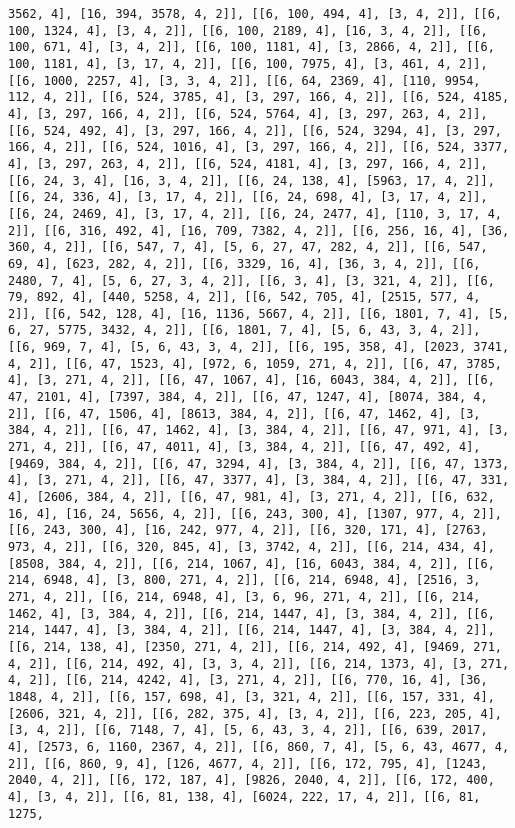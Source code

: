 \documentclass[12pt,fleqn]{article}\usepackage{../../common}
\begin{document}
\begin{verbatim}
3562, 4], [16, 394, 3578, 4, 2]], [[6, 100, 494, 4], [3, 4, 2]], [[6, 100, 1324, 4], [3, 4, 2]], [[6, 100, 2189, 4], [16, 3, 4, 2]], [[6, 100, 671, 4], [3, 4, 2]], [[6, 100, 1181, 4], [3, 2866, 4, 2]], [[6, 100, 1181, 4], [3, 17, 4, 2]], [[6, 100, 7975, 4], [3, 461, 4, 2]], [[6, 1000, 2257, 4], [3, 3, 4, 2]], [[6, 64, 2369, 4], [110, 9954, 112, 4, 2]], [[6, 524, 3785, 4], [3, 297, 166, 4, 2]], [[6, 524, 4185, 4], [3, 297, 166, 4, 2]], [[6, 524, 5764, 4], [3, 297, 263, 4, 2]], [[6, 524, 492, 4], [3, 297, 166, 4, 2]], [[6, 524, 3294, 4], [3, 297, 166, 4, 2]], [[6, 524, 1016, 4], [3, 297, 166, 4, 2]], [[6, 524, 3377, 4], [3, 297, 263, 4, 2]], [[6, 524, 4181, 4], [3, 297, 166, 4, 2]], [[6, 24, 3, 4], [16, 3, 4, 2]], [[6, 24, 138, 4], [5963, 17, 4, 2]], [[6, 24, 336, 4], [3, 17, 4, 2]], [[6, 24, 698, 4], [3, 17, 4, 2]], [[6, 24, 2469, 4], [3, 17, 4, 2]], [[6, 24, 2477, 4], [110, 3, 17, 4, 2]], [[6, 316, 492, 4], [16, 709, 7382, 4, 2]], [[6, 256, 16, 4], [36, 360, 4, 2]], [[6, 547, 7, 4], [5, 6, 27, 47, 282, 4, 2]], [[6, 547, 69, 4], [623, 282, 4, 2]], [[6, 3329, 16, 4], [36, 3, 4, 2]], [[6, 2480, 7, 4], [5, 6, 27, 3, 4, 2]], [[6, 3, 4], [3, 321, 4, 2]], [[6, 79, 892, 4], [440, 5258, 4, 2]], [[6, 542, 705, 4], [2515, 577, 4, 2]], [[6, 542, 128, 4], [16, 1136, 5667, 4, 2]], [[6, 1801, 7, 4], [5, 6, 27, 5775, 3432, 4, 2]], [[6, 1801, 7, 4], [5, 6, 43, 3, 4, 2]], [[6, 969, 7, 4], [5, 6, 43, 3, 4, 2]], [[6, 195, 358, 4], [2023, 3741, 4, 2]], [[6, 47, 1523, 4], [972, 6, 1059, 271, 4, 2]], [[6, 47, 3785, 4], [3, 271, 4, 2]], [[6, 47, 1067, 4], [16, 6043, 384, 4, 2]], [[6, 47, 2101, 4], [7397, 384, 4, 2]], [[6, 47, 1247, 4], [8074, 384, 4, 2]], [[6, 47, 1506, 4], [8613, 384, 4, 2]], [[6, 47, 1462, 4], [3, 384, 4, 2]], [[6, 47, 1462, 4], [3, 384, 4, 2]], [[6, 47, 971, 4], [3, 271, 4, 2]], [[6, 47, 4011, 4], [3, 384, 4, 2]], [[6, 47, 492, 4], [9469, 384, 4, 2]], [[6, 47, 3294, 4], [3, 384, 4, 2]], [[6, 47, 1373, 4], [3, 271, 4, 2]], [[6, 47, 3377, 4], [3, 384, 4, 2]], [[6, 47, 331, 4], [2606, 384, 4, 2]], [[6, 47, 981, 4], [3, 271, 4, 2]], [[6, 632, 16, 4], [16, 24, 5656, 4, 2]], [[6, 243, 300, 4], [1307, 977, 4, 2]], [[6, 243, 300, 4], [16, 242, 977, 4, 2]], [[6, 320, 171, 4], [2763, 973, 4, 2]], [[6, 320, 845, 4], [3, 3742, 4, 2]], [[6, 214, 434, 4], [8508, 384, 4, 2]], [[6, 214, 1067, 4], [16, 6043, 384, 4, 2]], [[6, 214, 6948, 4], [3, 800, 271, 4, 2]], [[6, 214, 6948, 4], [2516, 3, 271, 4, 2]], [[6, 214, 6948, 4], [3, 6, 96, 271, 4, 2]], [[6, 214, 1462, 4], [3, 384, 4, 2]], [[6, 214, 1447, 4], [3, 384, 4, 2]], [[6, 214, 1447, 4], [3, 384, 4, 2]], [[6, 214, 1447, 4], [3, 384, 4, 2]], [[6, 214, 138, 4], [2350, 271, 4, 2]], [[6, 214, 492, 4], [9469, 271, 4, 2]], [[6, 214, 492, 4], [3, 3, 4, 2]], [[6, 214, 1373, 4], [3, 271, 4, 2]], [[6, 214, 4242, 4], [3, 271, 4, 2]], [[6, 770, 16, 4], [36, 1848, 4, 2]], [[6, 157, 698, 4], [3, 321, 4, 2]], [[6, 157, 331, 4], [2606, 321, 4, 2]], [[6, 282, 375, 4], [3, 4, 2]], [[6, 223, 205, 4], [3, 4, 2]], [[6, 7148, 7, 4], [5, 6, 43, 3, 4, 2]], [[6, 639, 2017, 4], [2573, 6, 1160, 2367, 4, 2]], [[6, 860, 7, 4], [5, 6, 43, 4677, 4, 2]], [[6, 860, 9, 4], [126, 4677, 4, 2]], [[6, 172, 795, 4], [1243, 2040, 4, 2]], [[6, 172, 187, 4], [9826, 2040, 4, 2]], [[6, 172, 400, 4], [3, 4, 2]], [[6, 81, 138, 4], [6024, 222, 17, 4, 2]], [[6, 81, 1275, 
\end{verbatim}
\end{document}

